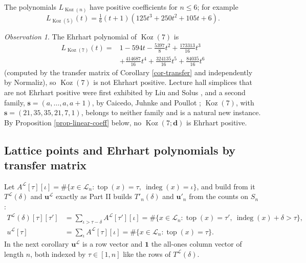 \documentclass[11pt, a4paper, abstract=yes]{scrartcl}
\theoremstyle{definition}
\theoremstyle{remark}
\theoremstyle{plain}
\newcommand{\vek}[1]{\boldsymbol{#1}}
\theoremstyle{remark}
\newtheorem{observation}[definition]{Observation}
\theoremstyle{plain}
\newcommand{\Koz}{\operatorname{Koz}}
\newcommand{\indeg}{\operatorname{indeg}}
\newcommand{\tp}{\operatorname{top}}
\begin{document}
The polynomials \(L_{\Koz(n)}\) have positive coefficients for \(n\le6\); for example
\[
  L_{\Koz(5)}(t)=\tfrac16(t+1)(125t^3+250t^2+105t+6).
\]

\begin{observation}
The Ehrhart polynomial of \(\Koz(7)\) is
\begin{equation*}
\begin{split}
  L_{\Koz(7)}(t)={}&1-594t-\tfrac{5397}8t^2+\tfrac{173313}{16}t^3\\
  &+\tfrac{414687}{16}t^4+\tfrac{324135}{16}t^5+\tfrac{84035}{16}t^6
\end{split}
\end{equation*}
(computed by the transfer matrix of Corollary \ref{cor-transfer} and independently by Normaliz), so
\(\Koz(7)\) is not Ehrhart positive. Lecture hall simplices that are not Ehrhart positive were first exhibited by Liu and Solus
\autocite[Theorem 4.3]{LiuSolus2019}, and a second family, \(\vek s=(a,\dots,a,a+1)\), by Caicedo,
Juhnke and Poullot \autocite[Theorem 3.5]{CaicedoJuhnkePoullot2025}; \(\Koz(7)\), with
\(\vek s=(21,35,35,21,7,1)\), belongs to neither family and is a natural new instance. By
Proposition \ref{prop-linear-coeff} below, no \(\Koz(7;\vek d)\) is Ehrhart positive.
\label{obs-positivity}
\end{observation}
\subsection{Lattice points and Ehrhart polynomials by transfer matrix}
\label{sec:org3124a23}

Let \(A^{\mathcal L}[\tau][\iota]=\#\lbrace x\in\mathcal L_n:\tp(x)=\tau,\ \indeg(x)=\iota\rbrace\), and
build from it \(T^{\mathcal L}(\delta)\) and \(\vek u^{\mathcal L}\) exactly as Part II builds
\(T'_n(\delta)\) and \(\vek u'_n\) from the counts on \(S_n\)
\autocite[Definition 28 and Theorem 41]{SnellmanArticle2}:
\begin{equation}\label{eq:transfer}
\begin{aligned}
  T^{\mathcal L}(\delta)[\tau][\tau']&=\sum_{\iota>\tau-\delta}A^{\mathcal L}[\tau'][\iota]
  =\#\lbrace x\in\mathcal L_n:\tp(x)=\tau',\ \indeg(x)+\delta>\tau\rbrace,\\
  u^{\mathcal L}[\tau]&=\sum_\iota A^{\mathcal L}[\tau][\iota]=\#\lbrace x\in\mathcal L_n:\tp(x)=\tau\rbrace .
\end{aligned}
\end{equation}
In the next corollary \(\vek u^{\mathcal L}\) is a row vector and \(\vek 1\) the all-ones column vector
of length \(n\), both indexed by \(\tau\in[1,n]\) like the rows of \(T^{\mathcal L}(\delta)\).
\end{document}
